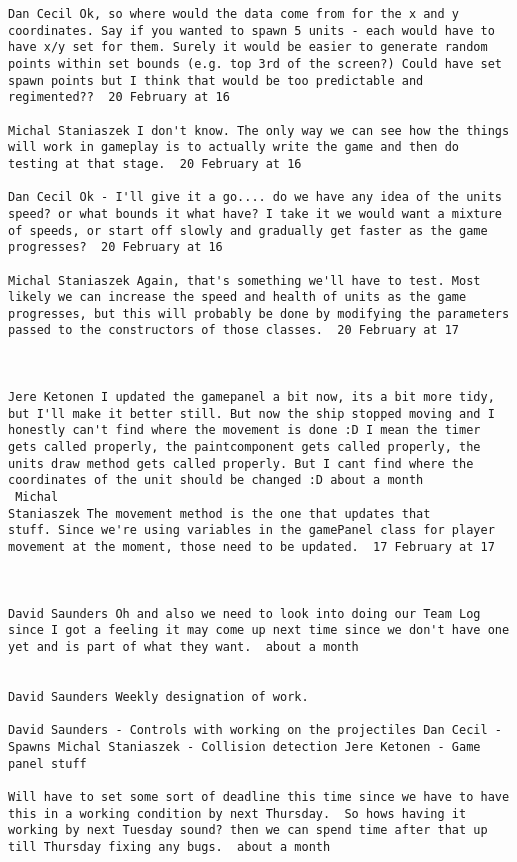 \documentclass[10pt]{report}
\begin{document}
\begin{verbatim}
Dan Cecil Ok, so where would the data come from for the x and y
coordinates. Say if you wanted to spawn 5 units - each would have to
have x/y set for them. Surely it would be easier to generate random
points within set bounds (e.g. top 3rd of the screen?) Could have set
spawn points but I think that would be too predictable and
regimented??  20 February at 16

Michal Staniaszek I don't know. The only way we can see how the things
will work in gameplay is to actually write the game and then do
testing at that stage.  20 February at 16

Dan Cecil Ok - I'll give it a go.... do we have any idea of the units
speed? or what bounds it what have? I take it we would want a mixture
of speeds, or start off slowly and gradually get faster as the game
progresses?  20 February at 16

Michal Staniaszek Again, that's something we'll have to test. Most
likely we can increase the speed and health of units as the game
progresses, but this will probably be done by modifying the parameters
passed to the constructors of those classes.  20 February at 17



Jere Ketonen I updated the gamepanel a bit now, its a bit more tidy,
but I'll make it better still. But now the ship stopped moving and I
honestly can't find where the movement is done :D I mean the timer
gets called properly, the paintcomponent gets called properly, the
units draw method gets called properly. But I cant find where the
coordinates of the unit should be changed :D about a month 
 Michal
Staniaszek The movement method is the one that updates that
stuff. Since we're using variables in the gamePanel class for player
movement at the moment, those need to be updated.  17 February at 17



David Saunders Oh and also we need to look into doing our Team Log
since I got a feeling it may come up next time since we don't have one
yet and is part of what they want.  about a month 


David Saunders Weekly designation of work.

David Saunders - Controls with working on the projectiles Dan Cecil -
Spawns Michal Staniaszek - Collision detection Jere Ketonen - Game
panel stuff

Will have to set some sort of deadline this time since we have to have
this in a working condition by next Thursday.  So hows having it
working by next Tuesday sound? then we can spend time after that up
till Thursday fixing any bugs.  about a month 



\end{verbatim}
\end{document}
